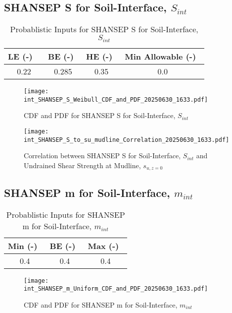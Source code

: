 \documentclass{article}
\begin{document}
\subsection*{SHANSEP S for Soil-Interface, $S_{int}$}
\begin{table}[h!]
\centering
\caption{Probablistic Inputs for SHANSEP S for Soil-Interface, $S_{int}$}
\begin{tabular}{|c|c|c|c|}
\hline
LE (-) \ & BE (-)\ & HE (-)\ & Min Allowable (-)\ \\
\hline
0.22 & 0.285 & 0.35 & 0.0 \\
\hline
\end{tabular}
\end{table}
\begin{figure}[h!]
\centering
\texttt{[image: int\_SHANSEP\_S\_Weibull\_CDF\_and\_PDF\_20250630\_1633.pdf]}
\caption{CDF and PDF for SHANSEP S for Soil-Interface, $S_{int}$}
\end{figure}
\begin{figure}[h!]
\centering
\texttt{[image: int\_SHANSEP\_S\_to\_su\_mudline\_Correlation\_20250630\_1633.pdf]}
\caption{Correlation between SHANSEP S for Soil-Interface, $S_{int}$ and Undrained Shear Strength at Mudline, $s_{{u,z=0}}$}
\end{figure}
\clearpage
\subsection*{SHANSEP m for Soil-Interface, $m_{int}$}
\begin{table}[h!]
\centering
\caption{Probablistic Inputs for SHANSEP m for Soil-Interface, $m_{int}$}
\begin{tabular}{|c|c|c|}
\hline
Min (-)\ & BE (-)\ & Max (-)\ \\
\hline
0.4 & 0.4 & 0.4 \\
\hline
\end{tabular}
\end{table}
\begin{figure}[h!]
\centering
\texttt{[image: int\_SHANSEP\_m\_Uniform\_CDF\_and\_PDF\_20250630\_1633.pdf]}
\caption{CDF and PDF for SHANSEP m for Soil-Interface, $m_{int}$}
\end{figure}
\clearpage
\end{document}
